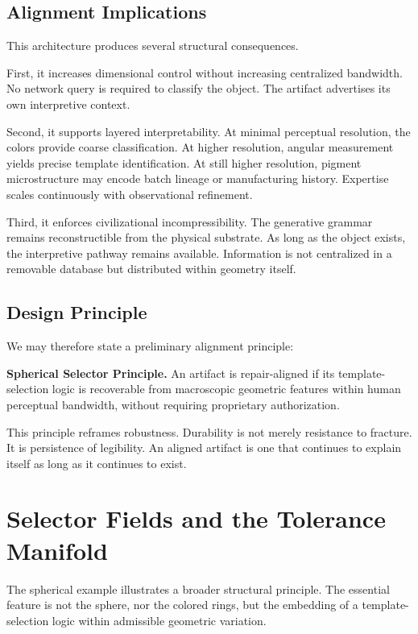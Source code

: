 \documentclass[11pt]{article}
\begin{document}
\subsection{Alignment Implications}

This architecture produces several structural consequences.

First, it increases dimensional control without increasing centralized 
bandwidth. No network query is required to classify the object. The 
artifact advertises its own interpretive context.

Second, it supports layered interpretability. At minimal perceptual 
resolution, the colors provide coarse classification. At higher 
resolution, angular measurement yields precise template identification. 
At still higher resolution, pigment microstructure may encode batch 
lineage or manufacturing history. Expertise scales continuously with 
observational refinement.

Third, it enforces civilizational incompressibility. The generative 
grammar remains reconstructible from the physical substrate. As long 
as the object exists, the interpretive pathway remains available. 
Information is not centralized in a removable database but distributed 
within geometry itself.

\subsection{Design Principle}

We may therefore state a preliminary alignment principle:

\medskip

\noindent
\textbf{Spherical Selector Principle.}
An artifact is repair-aligned if its template-selection logic is 
recoverable from macroscopic geometric features within human perceptual 
bandwidth, without requiring proprietary authorization.

\medskip

This principle reframes robustness. Durability is not merely resistance 
to fracture. It is persistence of legibility. An aligned artifact is one 
that continues to explain itself as long as it continues to exist.

\section{Selector Fields and the Tolerance Manifold}

The spherical example illustrates a broader structural principle. 
The essential feature is not the sphere, nor the colored rings, but 
the embedding of a template-selection logic within admissible 
geometric variation.
\end{document}
